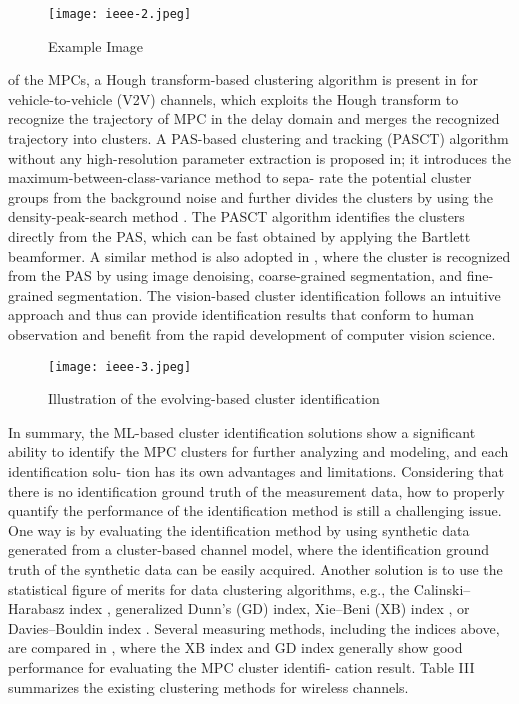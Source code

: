 \documentclass[conference]{IEEEtran}
\begin{document}
\begin{figure}[h]
    \centering
    \texttt{[image: ieee-2.jpeg]}
    \caption{Example Image}
    \label{fig:example}
\end{figure}




of the MPCs, a Hough transform-based clustering algorithm
is present in for vehicle-to-vehicle (V2V) channels,
which exploits the Hough transform \cite{w11} to recognize the
trajectory of MPC in the delay domain and merges the
recognized trajectory into clusters. A PAS-based clustering
and tracking (PASCT) algorithm without any high-resolution
parameter extraction is proposed in; it introduces
the maximum-between-class-variance method  to sepa-
rate the potential cluster groups from the background noise and
further divides the clusters by using the density-peak-search
method . The PASCT algorithm identifies the clusters
directly from the PAS, which can be fast obtained by applying
the Bartlett beamformer. A similar method is also adopted
in , where the cluster is recognized from the PAS by
using image denoising, coarse-grained segmentation, and fine-
grained segmentation.
The vision-based cluster identification follows an intuitive
approach and thus can provide identification results that
conform to human observation and benefit from the rapid
development of computer vision science.

\begin{figure}[h]
    \centering
    \texttt{[image: ieee-3.jpeg]}
    \caption{Illustration of the evolving-based cluster identification}
    \label{fig:example}
\end{figure}



In summary, the ML-based cluster identification solutions
show a significant ability to identify the MPC clusters for
further analyzing and modeling, and each identification solu-
tion has its own advantages and limitations. Considering that
there is no identification ground truth of the measurement data,
how to properly quantify the performance of the identification
method is still a challenging issue. \cite{66}One way is by evaluating
the identification method by using synthetic data generated
from a cluster-based channel model, where the identification
ground truth of the synthetic data can be easily acquired.
Another solution is to use the statistical figure of merits
for data clustering algorithms, e.g., the Calinski–Harabasz
index , generalized Dunn’s (GD) index, Xie–Beni
(XB) index , or Davies–Bouldin index . Several
measuring methods, including the indices above, are compared
in , where the XB index and GD index generally show
good performance for evaluating the MPC cluster identifi-
cation result. Table III summarizes the existing clustering
methods for wireless channels.
\end{document}
